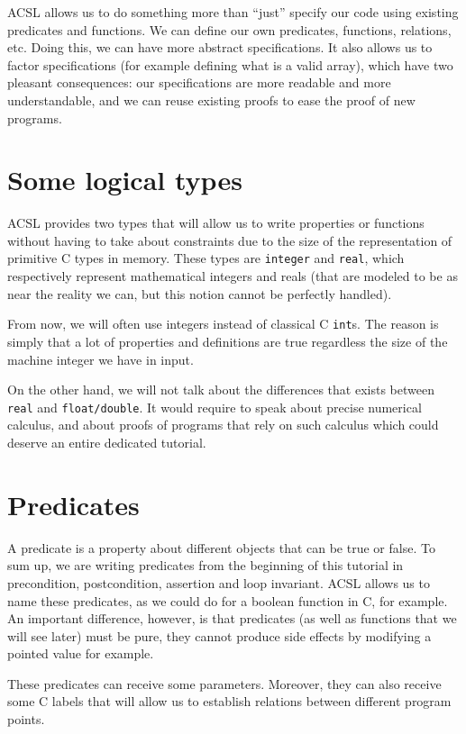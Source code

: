 \documentclass[12pt,francais,]{scrbook}
\begin{document}
ACSL allows us to do something more than ``just'' specify our code using
existing predicates and functions. We can define our own predicates,
functions, relations, etc. Doing this, we can have more abstract
specifications. It also allows us to factor specifications (for example
defining what is a valid array), which have two pleasant consequences:
our specifications are more readable and more understandable, and we can
reuse existing proofs to ease the proof of new programs.

\section{Some logical types}\label{some-logical-types}

ACSL provides two types that will allow us to write properties or
functions without having to take about constraints due to the size of
the representation of primitive C types in memory. These types are
\texttt{integer} and \texttt{real}, which respectively represent
mathematical integers and reals (that are modeled to be as near the
reality we can, but this notion cannot be perfectly handled).

From now, we will often use integers instead of classical C
\texttt{int}s. The reason is simply that a lot of properties and
definitions are true regardless the size of the machine integer we have
in input.

On the other hand, we will not talk about the differences that exists
between \texttt{real} and \texttt{float/double}. It would require to
speak about precise numerical calculus, and about proofs of programs
that rely on such calculus which could deserve an entire dedicated
tutorial.

\section{Predicates}\label{predicates}

A predicate is a property about different objects that can be true or
false. To sum up, we are writing predicates from the beginning of this
tutorial in precondition, postcondition, assertion and loop invariant.
ACSL allows us to name these predicates, as we could do for a boolean
function in C, for example. An important difference, however, is that
predicates (as well as functions that we will see later) must be pure,
they cannot produce side effects by modifying a pointed value for
example.

These predicates can receive some parameters. Moreover, they can also
receive some C labels that will allow us to establish relations between
different program points.
\end{document}
